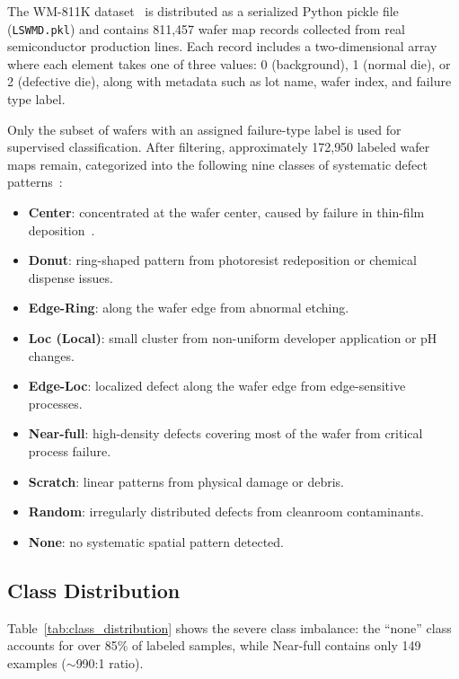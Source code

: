 \documentclass[conference]{IEEEtran}
\begin{document}
The WM-811K dataset~\cite{wu2015} is distributed as a serialized Python
pickle file (\texttt{LSWMD.pkl}) and contains 811{,}457 wafer map records
collected from real semiconductor production lines. Each record includes a
two-dimensional array where each element takes one of three values: 0
(background), 1 (normal die), or 2 (defective die), along with metadata such
as lot name, wafer index, and failure type label.

Only the subset of wafers with an assigned failure-type label is used for
supervised classification. After filtering, approximately 172{,}950 labeled
wafer maps remain, categorized into the following nine classes of systematic
defect patterns~\cite{chen2023,weng2010}:

\begin{itemize}
    \item \textbf{Center}: concentrated at the wafer center, caused by
          failure in thin-film deposition~\cite{chen2021}.
    \item \textbf{Donut}: ring-shaped pattern from photoresist redeposition or
          chemical dispense issues.
    \item \textbf{Edge-Ring}: along the wafer edge from abnormal etching.
    \item \textbf{Loc (Local)}: small cluster from non-uniform developer
          application or pH changes.
    \item \textbf{Edge-Loc}: localized defect along the wafer edge from
          edge-sensitive processes.
    \item \textbf{Near-full}: high-density defects covering most of the wafer
          from critical process failure.
    \item \textbf{Scratch}: linear patterns from physical damage or debris.
    \item \textbf{Random}: irregularly distributed defects from cleanroom
          contaminants.
    \item \textbf{None}: no systematic spatial pattern detected.
\end{itemize}

\subsection{Class Distribution}

Table~\ref{tab:class_distribution} shows the severe class imbalance: the
``none'' class accounts for over 85\% of labeled samples, while Near-full
contains only 149 examples ($\sim$990:1 ratio).
\end{document}
